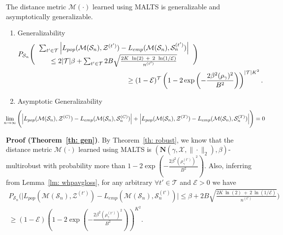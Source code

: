 \begin{theorem}
\label{th: gen}
The distance metric $\mathcal{M}(\cdot)$ learned using \textsc{MALTS} is generalizable and asymptotically generalizable. 
\begin{enumerate}
    \item Generalizability 
    \begin{eqnarray*}
     \lefteqn{P_{\mathcal{S}_n}\Bigg(
     \begin{tabular}{c} 
     $\sum_{t'\in\mathcal{T}} \Big| L_{pop}(\mathcal{M}(\mathcal{S}_n),\mathcal{Z}^{(t')}) - L_{emp}(\mathcal{M}(\mathcal{S}_n),\mathcal{S}_n^{(t')}) \Big|$ \\
     $\leq
     2|\mathcal{T}|\beta+ \sum_{t'\in\mathcal{T}} 2B\sqrt{\frac{2K~\ln(2)~+~2~\ln(1/\mathcal{E})}{n^{(t')}}}$
    \end{tabular}
     \Bigg)}\\
     &&\hspace*{150pt}\geq (1-\mathcal{E})^{\mathcal{T}}\left(1-2\exp\left(-\frac{2\beta^2(\rho_\gamma)^2}{B^2}\right)\right)^{|\mathcal{T}|K^2}.
\end{eqnarray*}
\item Asymptotic Generalizability$$ \hspace*{-25pt}\lim_{n\to\infty} \Bigg( \Big| L_{pop}(\mathcal{M}(\mathcal{S}_n),\mathcal{Z}^{(C)}) - L_{emp}(\mathcal{M}(\mathcal{S}_n),\mathcal{S}^{(C)}_n) \Big| + \Big| L_{pop}(\mathcal{M}(\mathcal{S}_n),\mathcal{Z}^{(T)}) - L_{emp}(\mathcal{M}(\mathcal{S}_n),\mathcal{S}^{(T)}_n) \Big| \Bigg) = 0$$
\end{enumerate}
\end{theorem}
\textbf{Proof (Theorem~\ref{th: gen})}. By Theorem~\ref{th: robust}, we know that the distance metric $ \mathcal{M}(\cdot) $ learned using \textsc{MALTS} is $(\mathbf{N}(\gamma,\mathcal{X},\|\cdot\|_2),\beta)$-multirobust with probability more than $1-2\exp\left(-\frac{2\beta^2(\rho^{(t')}_\gamma)^2}{B^2}\right)$.
Also, inferring from Lemma~\ref{lm: whpavgloss}, for any arbitrary $\forall t' \in \mathcal{T}$ and $\mathcal{E}>0$ we have
\begin{eqnarray*}
    P_{\mathcal{S}_n}\Bigg( \Big| L_{pop}(\mathcal{M}(\mathcal{S}_n),\mathcal{Z}^{(t')}) - L_{emp}(\mathcal{M}(\mathcal{S}_n),\mathcal{S}_n^{(t')}) \Big| \leq \beta + 2B\sqrt{\frac{2K~\ln(2)~+~2~\ln(1/\mathcal{E})}{n^{(t')}}} \Bigg) \\ 
    \geq (1-\mathcal{E})\left(1-2\exp\left(-\frac{2\beta^2(\rho^{(t')}_\gamma)^2}{B^2}\right)\right)^{K^2}.
\end{eqnarray*}

